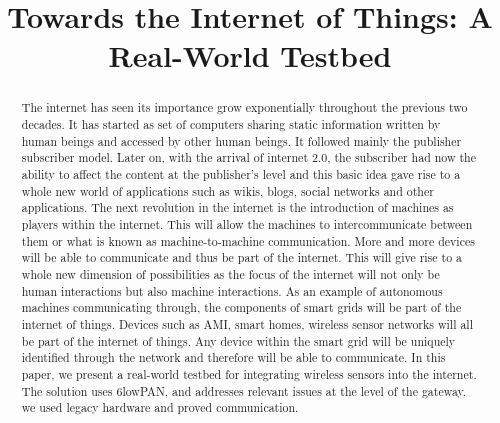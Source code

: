 \documentclass[conference]{IEEEtran}
\begin{document}
\title{Towards the Internet of Things: A Real-World Testbed}
\author{
\and
{}
\and
{}
}
\maketitle
\begin{abstract}
The internet has seen its importance grow exponentially throughout the previous two decades. It has started as set of computers sharing static information written by human beings and accessed by other human beings. It followed mainly the publisher subscriber model. Later on, with the arrival of internet 2.0, the subscriber had now the ability to affect the content at the publisher's level and this basic idea gave rise to a whole new world of applications such as wikis, blogs, social networks and other applications. The next revolution in the internet is the introduction of machines as players within the internet. This will allow the machines to intercommunicate between them or what is known as machine-to-machine communication. More and more devices will be able to communicate and thus be part of the internet. This will give rise to a whole new dimension of possibilities as the focus of the internet will not only be human interactions but also machine interactions. As an example of autonomous machines communicating through, the components of smart grids will be part of the internet of things. Devices such as AMI, smart homes, wireless sensor networks will all be part of the internet of things. Any device within the smart grid will be uniquely identified through the network and therefore will be able to communicate. In this paper, we present a real-world testbed for integrating wireless sensors into the internet. The solution uses 6lowPAN, and addresses relevant issues at the level of the gateway. we used legacy hardware and proved communication.
\end{abstract}
\end{document}
